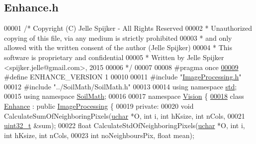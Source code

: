 \hypertarget{_enhance_8h_source}{}\subsection{Enhance.\+h}
\label{_enhance_8h_source}

\begin{DoxyCode}
00001 \textcolor{comment}{/* Copyright (C) Jelle Spijker - All Rights Reserved}
00002 \textcolor{comment}{ * Unauthorized copying of this file, via any medium is strictly prohibited}
00003 \textcolor{comment}{ * and only allowed with the written consent of the author (Jelle Spijker)}
00004 \textcolor{comment}{ * This software is proprietary and confidential}
00005 \textcolor{comment}{ * Written by Jelle Spijker <spijker.jelle@gmail.com>, 2015}
00006 \textcolor{comment}{ */}
00007 
00008 \textcolor{preprocessor}{#pragma once}
\hypertarget{_enhance_8h_source_l00009}{}\hyperlink{_enhance_8h_a127e6377e070fe2b1d4adeca7782ac41}{00009} \textcolor{preprocessor}{#define ENHANCE\_VERSION 1}
00010 
00011 \textcolor{preprocessor}{#include "\hyperlink{_image_processing_8h}{ImageProcessing.h}"}
00012 \textcolor{preprocessor}{#include "../SoilMath/SoilMath.h"}
00013 
00014 \textcolor{keyword}{using namespace }\hyperlink{namespacestd}{std};
00015 \textcolor{keyword}{using namespace }\hyperlink{namespace_soil_math}{SoilMath};
00016 
00017 \textcolor{keyword}{namespace }\hyperlink{namespace_vision}{Vision} \{
\hypertarget{_enhance_8h_source_l00018}{}\hyperlink{class_vision_1_1_enhance}{00018} \textcolor{keyword}{class }\hyperlink{class_vision_1_1_enhance}{Enhance} : \textcolor{keyword}{public} \hyperlink{class_vision_1_1_image_processing}{ImageProcessing} \{
00019 \textcolor{keyword}{private}:
00020   \textcolor{keywordtype}{void} CalculateSumOfNeighboringPixels(\hyperlink{_soil_math_types_8h_a65f85814a8290f9797005d3b28e7e5fc}{uchar} *O, \textcolor{keywordtype}{int} i, \textcolor{keywordtype}{int} hKsize, \textcolor{keywordtype}{int} nCols,
00021                                        \hyperlink{_soil_math_types_8h_a435d1572bf3f880d55459d9805097f62}{uint32\_t} &sum);
00022   \textcolor{keywordtype}{float} CalculateStdOfNeighboringPixels(\hyperlink{_soil_math_types_8h_a65f85814a8290f9797005d3b28e7e5fc}{uchar} *O, \textcolor{keywordtype}{int} i, \textcolor{keywordtype}{int} hKsize, \textcolor{keywordtype}{int} nCols,
00023                                         \textcolor{keywordtype}{int} noNeighboursPix, \textcolor{keywordtype}{float} mean);

\end{DoxyCode}
